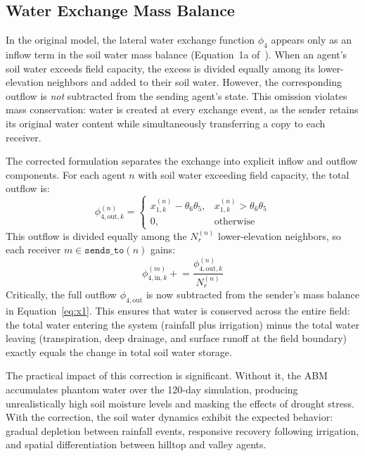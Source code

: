 \subsection{Water Exchange Mass Balance}
\label{sec:phi4_correction}

In the original model, the lateral water exchange function $\phi_4$ appears only as an inflow term in the soil water mass balance (Equation~1a of~\cite{Lopezjimenez2024}). When an agent's soil water exceeds field capacity, the excess is divided equally among its lower-elevation neighbors and added to their soil water. However, the corresponding outflow is \emph{not} subtracted from the sending agent's state. This omission violates mass conservation: water is created at every exchange event, as the sender retains its original water content while simultaneously transferring a copy to each receiver.

The corrected formulation separates the exchange into explicit inflow and outflow components. For each agent $n$ with soil water exceeding field capacity, the total outflow is:
\begin{equation}
    \phi_{4,\text{out},k}^{(n)} = 
    \begin{cases}
        x_{1,k}^{(n)} - \theta_6 \theta_5, & x_{1,k}^{(n)} > \theta_6 \theta_5 \\
        0, & \text{otherwise}
    \end{cases}
    \label{eq:phi4out}
\end{equation}
This outflow is divided equally among the $N_r^{(n)}$ lower-elevation neighbors, so each receiver $m \in \texttt{sends\_to}(n)$ gains:
\begin{equation}
    \phi_{4,\text{in},k}^{(m)} \mathrel{+}= \frac{\phi_{4,\text{out},k}^{(n)}}{N_r^{(n)}}
    \label{eq:phi4in}
\end{equation}
Critically, the full outflow $\phi_{4,\text{out}}$ is now subtracted from the sender's mass balance in Equation~\eqref{eq:x1}. This ensures that water is conserved across the entire field: the total water entering the system (rainfall plus irrigation) minus the total water leaving (transpiration, deep drainage, and surface runoff at the field boundary) exactly equals the change in total soil water storage.

The practical impact of this correction is significant. Without it, the ABM accumulates phantom water over the 120-day simulation, producing unrealistically high soil moisture levels and masking the effects of drought stress. With the correction, the soil water dynamics exhibit the expected behavior: gradual depletion between rainfall events, responsive recovery following irrigation, and spatial differentiation between hilltop and valley agents.


